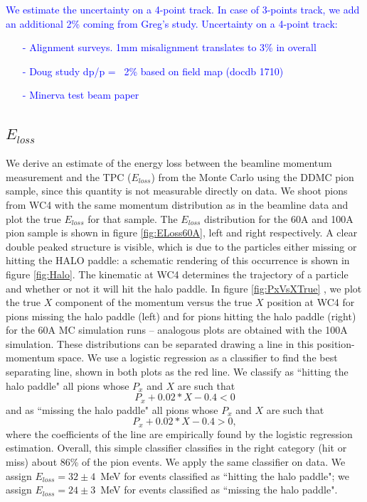 \textcolor{blue}{  
We estimate the uncertainty on a 4-point track. In case of 3-points track, we add an additional 2\% coming from Greg's study. 
Uncertainty on a 4-point track:
\begin{itemize}
\item[-]  Alignment surveys. 1mm misalignment translates to 3\% in overall
\item[-] Doug study dp/p = ~2\% based on field map (docdb 1710)
\item[-] Minerva test beam paper
\end{itemize}
}

\subsection{$E_{loss}$}
We derive an estimate of the energy loss between the beamline momentum measurement and the TPC ($E_{loss}$) from the Monte Carlo using the DDMC pion sample, since this quantity is not  measurable directly on data. We shoot pions from WC4 with the same momentum distribution as in the beamline data and plot the true $E_{loss}$ for that sample. The $E_{loss}$ distribution for the 60A  and 100A pion sample is shown in figure \ref{fig:ELoss60A}, left and right respectively. A clear double peaked structure is visible, which is due to the particles either missing or hitting the HALO paddle: a schematic rendering of this occurrence is  shown in figure \ref{fig:Halo}. The kinematic at WC4 determines the trajectory of a particle and whether or not it will hit the halo paddle. In figure \ref{fig:PxVsXTrue} , we plot the true  $X$ component of the momentum versus the true $X$ position at WC4 for pions missing the halo paddle (left) and for pions hitting the halo paddle (right) for the 60A MC simulation runs -- analogous plots are obtained with the 100A simulation. These distributions can be separated drawing a line in this position-momentum space. 
We use a logistic regression  \cite{agresti2013categorical}  as a classifier to find the best separating line, shown in both plots as the red line. We classify as ``hitting the halo paddle" all pions whose $P_x$ and $X$ are such that $$P_x +0.02* X - 0.4 < 0 $$ and as ``missing the halo  paddle" all pions whose $P_x$ and $X$ are such that $$P_x +0.02*X - 0.4 > 0, $$ where the coefficients of the line are empirically found by the logistic regression estimation. Overall, this simple classifier classifies in the right category (hit or miss) about 86\% of the pion events.
We apply the same classifier on data. We assign  $E_{loss} = 32 \pm 4 $~MeV for events classified as ``hitting the halo paddle"; we assign  $E_{loss} = 24 \pm 3 $~MeV for events classified as ``missing the halo paddle".

